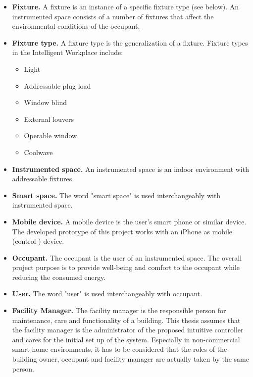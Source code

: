 \begin{itemize}

\item \textbf{Fixture.} A fixture is an instance of a specific fixture type (see below). An instrumented space consists of a number of fixtures that affect the environmental conditions of the occupant. 

\item \textbf{Fixture type.} A fixture type is the generalization of a fixture. Fixture types in the Intelligent Workplace include:
	\begin{itemize}
		\item Light
		\item Addressable plug load
		\item Window blind
		\item External louvers
		\item Operable window
		\item Coolwave
	\end{itemize}

\item \textbf{Instrumented space.} An instrumented space is an indoor environment with addressable fixtures

\item \textbf{Smart space.} The word "smart space" is used interchangeably with instrumented space.

\item \textbf{Mobile device.} A mobile device is the user's smart phone or similar device. The developed prototype of this project works with an iPhone as mobile (control-) device.

\item \textbf{Occupant.} The occupant is the user of an instrumented space. The overall project purpose is to provide well-being and comfort to the occupant while reducing the consumed energy.

\item \textbf{User.} The word "user" is used interchangeably with occupant.

\item \textbf{Facility Manager.} The facility manager is the responsible person for maintenance, care and functionality of a building. This thesis assumes that the facility manager is the administrator of the proposed intuitive controller and cares for the initial set up of the system. Especially in non-commercial smart home environments, it has to be considered that the roles of the building owner, occupant and facility manager are actually taken by the same person.

\end{itemize}
